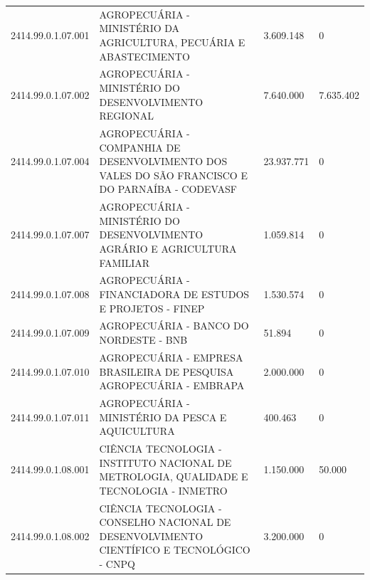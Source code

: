 \documentclass{article}
\begin{document}
\begin{longtable}[c]{m{2cm}|m{11cm}|m{2cm}m{2cm}}
\multicolumn{1}{C{2cm}|}{2414.99.0.1.07.001} & \multicolumn{1}{L{11cm}|}{AGROPECUÁRIA - MINISTÉRIO DA AGRICULTURA, PECUÁRIA E ABASTECIMENTO} & \multicolumn{1}{R{2cm}|}{3.609.148} & \multicolumn{1}{R{2cm}}{            0} \\
\multicolumn{1}{C{2cm}|}{2414.99.0.1.07.002} & \multicolumn{1}{L{11cm}|}{AGROPECUÁRIA - MINISTÉRIO DO DESENVOLVIMENTO REGIONAL} & \multicolumn{1}{R{2cm}|}{7.640.000} & \multicolumn{1}{R{2cm}}{7.635.402} \\
\multicolumn{1}{C{2cm}|}{2414.99.0.1.07.004} & \multicolumn{1}{L{11cm}|}{AGROPECUÁRIA - COMPANHIA DE DESENVOLVIMENTO DOS VALES DO SÃO FRANCISCO E DO PARNAÍBA - CODEVASF} & \multicolumn{1}{R{2cm}|}{23.937.771} & \multicolumn{1}{R{2cm}}{            0} \\
\multicolumn{1}{C{2cm}|}{2414.99.0.1.07.007} & \multicolumn{1}{L{11cm}|}{AGROPECUÁRIA - MINISTÉRIO DO DESENVOLVIMENTO AGRÁRIO E AGRICULTURA FAMILIAR} & \multicolumn{1}{R{2cm}|}{1.059.814} & \multicolumn{1}{R{2cm}}{            0} \\
\multicolumn{1}{C{2cm}|}{2414.99.0.1.07.008} & \multicolumn{1}{L{11cm}|}{AGROPECUÁRIA - FINANCIADORA DE ESTUDOS E PROJETOS - FINEP} & \multicolumn{1}{R{2cm}|}{1.530.574} & \multicolumn{1}{R{2cm}}{            0} \\
\multicolumn{1}{C{2cm}|}{2414.99.0.1.07.009} & \multicolumn{1}{L{11cm}|}{AGROPECUÁRIA - BANCO DO NORDESTE - BNB} & \multicolumn{1}{R{2cm}|}{51.894} & \multicolumn{1}{R{2cm}}{            0} \\
\multicolumn{1}{C{2cm}|}{2414.99.0.1.07.010} & \multicolumn{1}{L{11cm}|}{AGROPECUÁRIA - EMPRESA BRASILEIRA DE PESQUISA AGROPECUÁRIA - EMBRAPA} & \multicolumn{1}{R{2cm}|}{2.000.000} & \multicolumn{1}{R{2cm}}{            0} \\
\multicolumn{1}{C{2cm}|}{2414.99.0.1.07.011} & \multicolumn{1}{L{11cm}|}{AGROPECUÁRIA - MINISTÉRIO DA PESCA E AQUICULTURA} & \multicolumn{1}{R{2cm}|}{400.463} & \multicolumn{1}{R{2cm}}{            0} \\
\multicolumn{1}{C{2cm}|}{2414.99.0.1.08.001} & \multicolumn{1}{L{11cm}|}{CIÊNCIA TECNOLOGIA - INSTITUTO NACIONAL DE METROLOGIA, QUALIDADE E TECNOLOGIA - INMETRO} & \multicolumn{1}{R{2cm}|}{1.150.000} & \multicolumn{1}{R{2cm}}{50.000} \\
\multicolumn{1}{C{2cm}|}{2414.99.0.1.08.002} & \multicolumn{1}{L{11cm}|}{CIÊNCIA TECNOLOGIA - CONSELHO NACIONAL DE DESENVOLVIMENTO CIENTÍFICO E TECNOLÓGICO - CNPQ} & \multicolumn{1}{R{2cm}|}{3.200.000} & \multicolumn{1}{R{2cm}}{            0} \\

\end{longtable}
\end{document}
